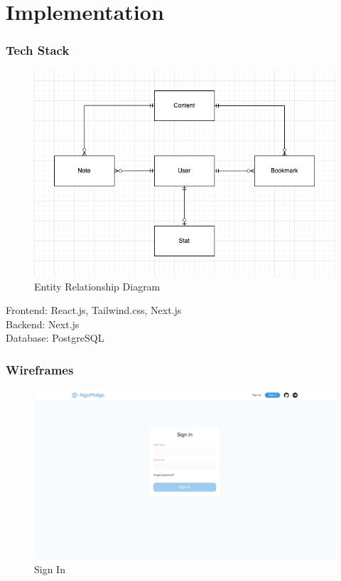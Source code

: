 \chapter{Implementation}\label{ch:5}
\subsection{Tech Stack}

\begin{figure}[h]
    \centering
    \includegraphics[scale=0.5]{figures/erd.png}
    \caption{Entity Relationship Diagram}
    \label{fig:gp}
\end{figure}

\pagebreak
Frontend: React.js, Tailwind.css, Next.js \\
Backend: Next.js \\
Database: PostgreSQL \\


\subsection{Wireframes}

\begin{figure}[h]
    \centering
    \includegraphics[scale=0.3]{figures/signin.png}
    \caption{Sign In}
    \label{fig:gp}
\end{figure}

